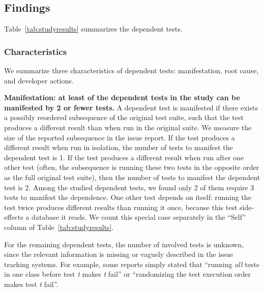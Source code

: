 \subsection{Findings}
\label{sec:studyfindings}



Table~\ref{tab:studyresults} summarizes the dependent tests.


\subsubsection{Characteristics}


We summarize three characteristics of dependent tests:
manifestation, root cause, and developer actions.

\vspace{1mm}
\noindent \textbf{{Manifestation: at least \pertange of the dependent
tests in the study can be manifested by 2 or fewer tests.}}
A dependent test is manifested if there exists a possibly reordered
subsequence of the original test suite, such that the test
produces a different
result than when run in the original suite.
We measure the size of the reported subsequence 
in the issue report.
If the test produces a different result when run
in isolation, the number of tests to manifest
the dependent test is 1.
If the test produces a different result
when run after one other test (often, the subsequence is
running these two tests in the opposite order as the full original test
suite), then the number of tests to manifest the dependent test is 2.
Among the \dtnum studied dependent tests, we found only 2 of them
require 3 tests to manifest the dependence.
One other test depends on itself:
running the test twice produces different results than running it once,
because this test side-effects a database it reads.
We count this special case separately in the ``Self'' column
of Table~\ref{tab:studyresults}.

For the remaining \unum dependent tests, the number of involved tests
is unknown, since the relevant information is missing
or vaguely described in the issue tracking systems. For example,
some reports simply stated that ``running \textit{all} tests in one class before
test \emph{t} makes \emph{t} fail'' or ``randomizing the test execution order
makes test \emph{t} fail''.



